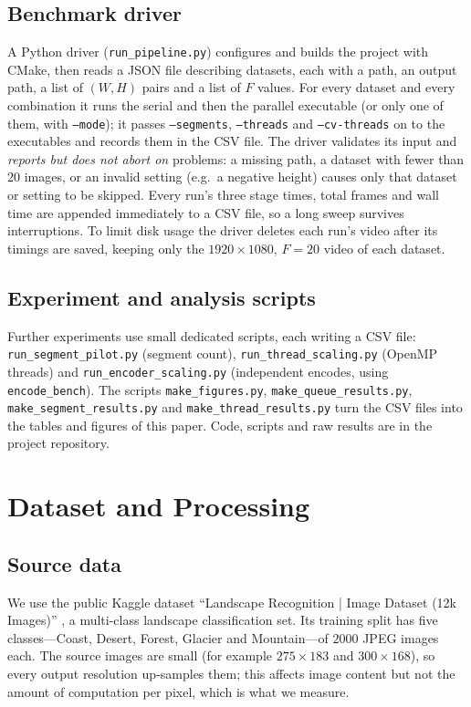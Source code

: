 \documentclass[conference]{IEEEtran}
\begin{document}
\subsection{Benchmark driver}
A Python driver (\texttt{run\_pipeline.py}) configures and builds the project with CMake, then reads a JSON file describing datasets, each with a path, an output path, a list of $(W,H)$ pairs and a list of $F$ values. For every dataset and every combination it runs the serial and then the parallel executable (or only one of them, with \texttt{--mode}); it passes \texttt{--segments}, \texttt{--threads} and \texttt{--cv-threads} on to the executables and records them in the CSV file. The driver validates its input and \emph{reports but does not abort on} problems: a missing path, a dataset with fewer than $20$ images, or an invalid setting (e.g.\ a negative height) causes only that dataset or setting to be skipped. Every run's three stage times, total frames and wall time are appended immediately to a CSV file, so a long sweep survives interruptions. To limit disk usage the driver deletes each run's video after its timings are saved, keeping only the $1920\times1080$, $F{=}20$ video of each dataset.

\subsection{Experiment and analysis scripts}
Further experiments use small dedicated scripts, each writing a CSV file: \texttt{run\_segment\_pilot.py} (segment count), \texttt{run\_thread\_scaling.py} (OpenMP threads) and \texttt{run\_encoder\_scaling.py} (independent encodes, using \texttt{encode\_bench}). The scripts \texttt{make\_figures.py}, \texttt{make\_queue\_results.py}, \texttt{make\_segment\_results.py} and \texttt{make\_thread\_results.py} turn the CSV files into the tables and figures of this paper. Code, scripts and raw results are in the project repository.

\section{Dataset and Processing}

\subsection{Source data}
We use the public Kaggle dataset ``Landscape Recognition | Image Dataset (12k Images)'' \cite{kaggle_landscape}, a multi-class landscape classification set. Its training split has five classes---Coast, Desert, Forest, Glacier and Mountain---of $2000$ JPEG images each. The source images are small (for example $275\times183$ and $300\times168$), so every output resolution up-samples them; this affects image content but not the amount of computation per pixel, which is what we measure.
\end{document}
